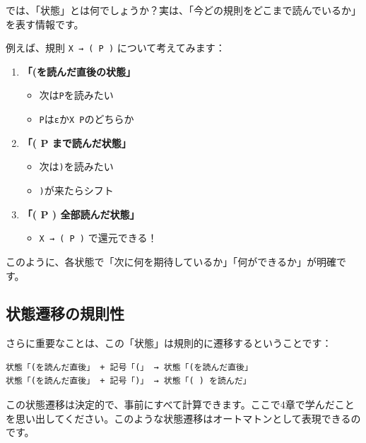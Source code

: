 では、「状態」とは何でしょうか？実は、「今どの規則をどこまで読んでいるか」を表す情報です。

例えば、規則 \texttt{X\ →\ (\ P\ )} について考えてみます：

\begin{enumerate}
\def\labelenumi{\arabic{enumi}.}
\item
  \textbf{「(を読んだ直後の状態」}

  \begin{itemize}
  \tightlist
  \item
    次は\texttt{P}を読みたい
  \item
    \texttt{P}は\texttt{ε}か\texttt{X\ P}のどちらか
  \end{itemize}
\item
  \textbf{「( P まで読んだ状態」}

  \begin{itemize}
  \tightlist
  \item
    次は\texttt{)}を読みたい
  \item
    \texttt{)}が来たらシフト
  \end{itemize}
\item
  \textbf{「( P ) 全部読んだ状態」}

  \begin{itemize}
  \tightlist
  \item
    \texttt{X\ →\ (\ P\ )} で還元できる！
  \end{itemize}
\end{enumerate}

このように、各状態で「次に何を期待しているか」「何ができるか」が明確です。

\hypertarget{chapter5-ux72b6ux614bux9077ux79fbux306eux898fux5247ux6027}{%
\subsection{状態遷移の規則性}\label{chapter5-ux72b6ux614bux9077ux79fbux306eux898fux5247ux6027}}

さらに重要なことは、この「状態」は規則的に遷移するということです：

\begin{verbatim}
状態「(を読んだ直後」 + 記号「(」 → 状態「(を読んだ直後」
状態「(を読んだ直後」 + 記号「)」 → 状態「( ) を読んだ」
\end{verbatim}

この状態遷移は決定的で、事前にすべて計算できます。ここで4章で学んだことを思い出してください。このような状態遷移はオートマトンとして表現できるのです。

